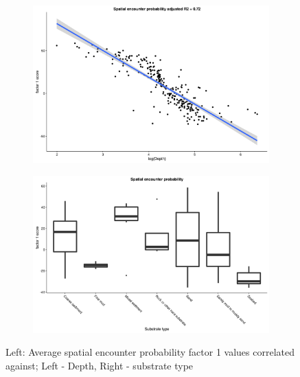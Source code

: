 \documentclass{article}
\newcommand{\beginsupplement}{%
		        \setcounter{table}{0}
		        \renewcommand{\thetable}{S\arabic{table}}%
		        \setcounter{figure}{0}
		        \renewcommand{\thefigure}{S\arabic{figure}}%
			     }
\begin{document}
\beginsupplement




\begin{figure}[!ht]
	\label{fig:S1}
	\begin{subfigure}{0.5\textwidth}
	\includegraphics[width = \linewidth]{"figures/Factor1_DepthO1"}
\end{subfigure}
\begin{subfigure}{0.5\textwidth}
	\includegraphics[width = \linewidth]{"figures/Factor1_HabitatO1"}
\end{subfigure}
\caption{Left: Average spatial encounter probability factor 1 values correlated
	against; Left - Depth, Right - substrate type}

\end{figure}

\end{document}
